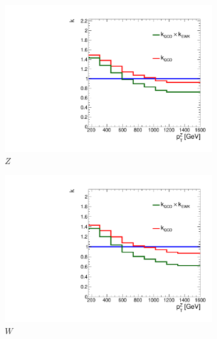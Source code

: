 \begin{figure}[]
    \begin{center}
        \begin{subfigure}[t]{0.32\textwidth}
            \includegraphics[width=\textwidth]{figures/monotop/kfactors/zcorr_ptv.pdf}
            \caption{$Z$}
        \end{subfigure}
        \begin{subfigure}[t]{0.32\textwidth}
            \includegraphics[width=\textwidth]{figures/monotop/kfactors/wcorr_ptv.pdf}
            \caption{$W$}
        \end{subfigure}
        \begin{subfigure}[t]{0.32\textwidth}

\end{subfigure}
\end{center}
\end{figure}
